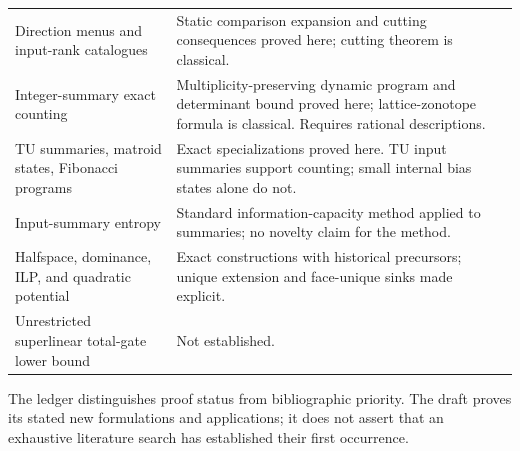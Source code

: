 \documentclass[11pt]{article}
\theoremstyle{definition}
\begin{document}
\begin{center}
\begin{tabularx}{\textwidth}{@{}>{\raggedright\arraybackslash}p{}>{\raggedright\arraybackslash}X@{}}
Direction menus and input-rank catalogues & Static comparison expansion and cutting consequences proved here; cutting theorem is classical.\\
Integer-summary exact counting & Multiplicity-preserving dynamic program and determinant bound proved here; lattice-zonotope formula is classical. Requires rational descriptions.\\
TU summaries, matroid states, Fibonacci programs & Exact specializations proved here. TU input summaries support counting; small internal bias states alone do not.\\
Input-summary entropy & Standard information-capacity method applied to summaries; no novelty claim for the method.\\
Halfspace, dominance, ILP, and quadratic potential & Exact constructions with historical precursors; unique extension and face-unique sinks made explicit.\\
Unrestricted superlinear total-gate lower bound & Not established.\\
\bottomrule
\end{tabularx}
\end{center}

The ledger distinguishes proof status from bibliographic priority. The draft proves its stated new formulations and applications; it does not assert that an exhaustive literature search has established their first occurrence.
\end{document}
